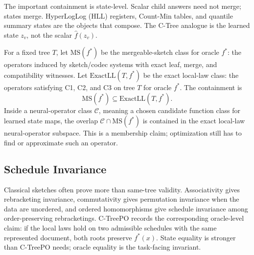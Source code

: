 The important containment is state-level. Scalar child answers need not merge;
states merge. HyperLogLog (HLL) registers, Count-Min tables, and quantile
summary states are the objects that compose. The C-Tree analogue is the
learned state \(z_v\), not the scalar \(\widehat f(z_v)\).

For a fixed tree \(T\), let \(\mathrm{MS}(f^\ast)\) be the mergeable-sketch
class for oracle \(f^\ast\): the operators induced by sketch/codec systems
with exact leaf, merge, and compatibility witnesses. Let
\(\mathrm{ExactLL}(T,f^\ast)\) be the exact local-law class: the operators
satisfying C1, C2, and C3 on tree \(T\) for oracle \(f^\ast\). The containment
is
\[
  \mathrm{MS}(f^\ast)\subseteq \mathrm{ExactLL}(T,f^\ast).
\]
Inside a neural-operator class \(\mathcal C\), meaning a chosen candidate
function class for learned state maps, the overlap
\(\mathcal C\cap\mathrm{MS}(f^\ast)\) is contained in the exact local-law
neural-operator subspace. This is a membership claim; optimization still has
to find or approximate such an operator.

\subsection{Schedule Invariance}

Classical sketches often prove more than same-tree validity. Associativity
gives rebracketing invariance, commutativity gives permutation invariance when
the data are unordered, and ordered homomorphisms give schedule invariance
among order-preserving rebracketings. C-TreePO records the corresponding
oracle-level claim: if the local laws hold on two admissible schedules with the
same represented document, both roots preserve \(f^\ast(x)\). State equality is
stronger than C-TreePO needs; oracle equality is the task-facing invariant.
